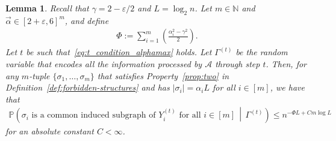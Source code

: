 \documentclass[11pt]{article}
\theoremstyle{plain}
\newtheorem{lemma}{Lemma}
\theoremstyle{definition}
\theoremstyle{remark}
\newcommand{\avec}{\vec{\alpha}}
\newcommand{\N}{\mathbb{N}}
\newcommand{\eps}{\varepsilon}
\newcommand{\Alg}{\mathcal{A}}
\renewcommand{\Pr}{\mathbb{P}}
\begin{document}
\begin{lemma}\label{lem:Z-probability}
    Recall that $\gamma = 2 - \eps/2$ and $L = \log_2 n$. 
    Let $m \in \N$ and $\avec \in [2+\eps, 6]^m$, and define 
    \begin{align*}
        \Phi := \sum_{i=1}^m \left(\frac{\alpha_i^2 - \gamma^2}{2}\right).
    \end{align*}    
    Let $t$ be such that~\eqref{eq:t_condition_alphamax} holds. 
    Let $\Gamma^{(t)}$ be the random variable that encodes all the information processed by $\Alg$ through step $t$. 
    Then, for any 
    $m$-tuple $\{\sigma_1, \dots, \sigma_m\}$ that satisfies 
    Property~\ref{prop:two} in Definition~\ref{def:forbidden-structures} 
    and has $|\sigma_i| = \alpha_iL$ for all $i \in [m]$, 
    we have that
    \begin{align*}
        \Pr\left(\sigma_i \text{ is a common induced subgraph of } Y_{i}^{(t)} \text{ for all } i \in [m] \, \middle| \, \Gamma^{(t)}\right) 
        \leq n^{-\Phi L + C m \log L}
    \end{align*}
    for an absolute constant $C < \infty$.
\end{lemma}
\end{document}
